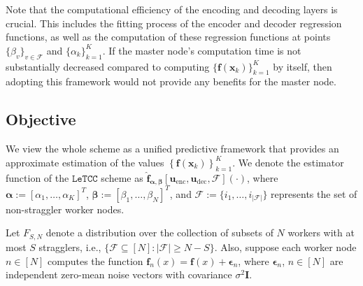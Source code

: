 \documentclass{article}
\def\enc{\mathbf{u}_\textrm{enc}}
\def\dec{\mathbf{u}_\textrm{dec}}
\def\nprcc{\texttt{LeTCC}}
\def\func{\mathbf{f}}
\def\stset{\mathcal{F}}
\def\fhat{\mathbf{\hat{f}}}
\def\est{\fhat_{\bm{\alpha},\bm{\beta}}[\enc, \dec, \stset]}
\begin{document}
Note that the computational efficiency of the encoding and decoding layers is crucial. This includes the fitting process of the encoder and decoder regression functions, as well as the computation of these regression functions at points  $\{\beta_v\}_{v\in \stset}$ and $\{\alpha_k\}^K_{k=1}$. If the master node's computation time is not substantially decreased compared to computing $\{\func(\mathbf{x}_k)\}^K_{k=1}$ by itself, then adopting this framework would not provide any benefits for the master node.

\subsection{Objective}\label{sec:objective}
We view the whole scheme as a unified predictive framework that provides an approximate estimation of the values $\left\{\func(\mathbf{x}_k)\right\}^K_{k=1}$. We denote the estimator function of the $\nprcc$ scheme as $\est(\cdot)$, where $\bm{\alpha} := [\alpha_1, \dots, \alpha_K]^T$, $\bm{\beta} := [\beta_1, \dots, \beta_N]^T$, and $\stset:=\{{i_1}, \dots, {i_{|\stset|}}\}$ represents the set of non-straggler worker nodes.

Let $F_{S,N}$ denote a distribution over the collection of subsets of $N$ workers with at most $S$ stragglers, i.e.,
\(
\{\mathcal{F} \subseteq [N] : |\mathcal{F}| \geq N - S\}
\). Also, suppose each worker node $n \in [N]$ computes the function $\func_n(x) = \func(x) + \bm{\epsilon}_n$,  where $\bm{\epsilon}_n$, $n \in [N]$  are independent zero-mean noise vectors with covariance $\sigma^2\mathbf{I}$.
\end{document}
